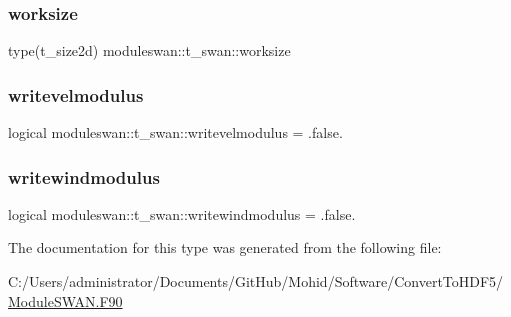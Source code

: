 \subsubsection{\texorpdfstring{worksize}{worksize}}
{\footnotesize\ttfamily type(t\+\_\+size2d) moduleswan\+::t\+\_\+swan\+::worksize\hspace{0.3cm}{\ttfamily [private]}}

\mbox{\label{structmoduleswan_1_1t__swan_afb02b3499eee9a6090d2e49183555a8f}} 
\subsubsection{\texorpdfstring{writevelmodulus}{writevelmodulus}}
{\footnotesize\ttfamily logical moduleswan\+::t\+\_\+swan\+::writevelmodulus = .false.\hspace{0.3cm}{\ttfamily [private]}}

\mbox{\label{structmoduleswan_1_1t__swan_a94983ffcbe49cd6b95a057a28bf2d173}} 
\subsubsection{\texorpdfstring{writewindmodulus}{writewindmodulus}}
{\footnotesize\ttfamily logical moduleswan\+::t\+\_\+swan\+::writewindmodulus = .false.\hspace{0.3cm}{\ttfamily [private]}}



The documentation for this type was generated from the following file\+:\begin{DoxyCompactItemize}
\item 
C\+:/\+Users/administrator/\+Documents/\+Git\+Hub/\+Mohid/\+Software/\+Convert\+To\+H\+D\+F5/\mbox{\hyperlink{_module_s_w_a_n_8_f90}{Module\+S\+W\+A\+N.\+F90}}\end{DoxyCompactItemize}
